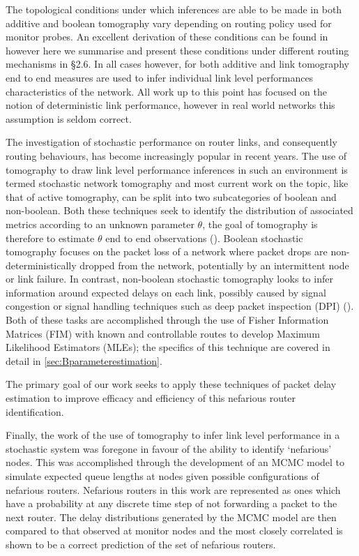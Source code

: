 The topological conditions under which inferences are able to be made in both additive and boolean tomography vary depending on routing policy used for monitor probes. An excellent derivation of these conditions can be found in \cite{he_network_2021} however here we summarise and present these conditions under different routing mechanisms in §2.6. In all cases however, for both additive and link tomography end to end measures are used to infer individual link level performances characteristics of the network. All work up to this point has focused on the notion of deterministic link performance, however in real world networks this assumption is seldom correct.\par
The investigation of stochastic performance on router links, and consequently routing behaviours, has become increasingly popular in recent years. The use of tomography to draw link level performance inferences in such an environment is termed stochastic network tomography and most current work on the topic, like that of active tomography, can be split into two subcategories of boolean and non-boolean. Both these techniques seek to identify the distribution of associated metrics according to an unknown parameter $\theta$, the goal of tomography is therefore to estimate $\theta$ end to end observations (\cite{he_fisher_2015}). Boolean stochastic tomography focuses on the packet loss of a network where packet drops are non-deterministically dropped from the network, potentially by an intermittent node or link failure. In contrast, non-boolean stochastic tomography looks to infer information around expected delays on each link, possibly caused by signal congestion or signal handling techniques such as deep packet inspection (DPI) (\cite{el-maghraby_survey_2017}). Both of these tasks are accomplished through the use of Fisher Information Matrices (FIM) with known and controllable routes to develop Maximum Likelihood Estimators (MLEs); the specifics of this technique are covered in detail in \cref{sec:Bparameterestimation}.\par
The primary goal of our work seeks to apply these techniques of packet delay estimation to improve efficacy and efficiency of this nefarious router identification.\par
Finally, the work of \cite{barnes_stochastic_2020} the use of tomography to infer link level performance in a stochastic system was foregone in favour of the ability to identify ‘nefarious’ nodes. This was accomplished through the development of an MCMC model to simulate expected queue lengths at nodes given possible configurations of nefarious routers. Nefarious routers in this work are represented as ones which have a probability at any discrete time step of not forwarding a packet to the next router. The delay distributions generated by the MCMC model are then compared to that observed at monitor nodes and the most closely correlated is shown to be a correct prediction of the set of nefarious routers.